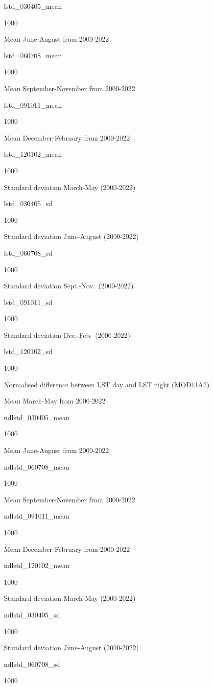\documentclass[
  10pt,
  b5paper,
  oneside]{book}
\begin{document}
lstd\_030405\_mean

1000

Mean June-August from 2000-2022

lstd\_060708\_mean

1000

Mean September-November from 2000-2022

lstd\_091011\_mean

1000

Mean December-February from 2000-2022

lstd\_120102\_mean

1000

Standard deviation March-May (2000-2022)

lstd\_030405\_sd

1000

Standard deviation June-August (2000-2022)

lstd\_060708\_sd

1000

Standard deviation Sept.-Nov.~(2000-2022)

lstd\_091011\_sd

1000

Standard deviation Dec.-Feb.~(2000-2022)

lstd\_120102\_sd

1000

Normalised difference between LST day and LST night (MOD11A2)

Mean March-May from 2000-2022

ndlstd\_030405\_mean

1000

Mean June-August from 2000-2022

ndlstd\_060708\_mean

1000

Mean September-November from 2000-2022

ndlstd\_091011\_mean

1000

Mean December-February from 2000-2022

ndlstd\_120102\_mean

1000

Standard deviation March-May (2000-2022)

ndlstd\_030405\_sd

1000

Standard deviation June-August (2000-2022)

ndlstd\_060708\_sd

1000
\end{document}
